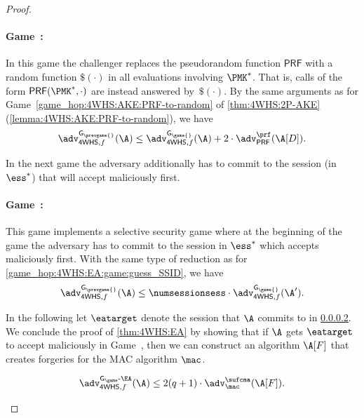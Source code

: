 \begin{proof}
\newgame
\paragraph{Game~\game:}\label{game_hop:4WHS:EA:PRF-to-random}
In this game the challenger replaces the pseudorandom function $\mathsf{PRF}$
with a random function $\$(\cdot)$ in all evaluations involving $\PMK^*$.
That is, calls of the form $\mathsf{PRF}(\PMK^*,\cdot)$ are instead answered by~$\$(\cdot)$.
By the same arguments as for Game~\ref{game_hop:4WHS:AKE:PRF-to-random} of \cref{thm:4WHS:2P-AKE} (\cref{lemma:4WHS:AKE:PRF-to-random}),
we have
\begin{equation}
	\adv_{\mathsf{4WHS},f}^{\mathsf{G_{\prevgame{}}}}(\A) 
		\leq  \adv_{\mathsf{4WHS},f}^{\mathsf{G_{\game{}}}}(\A) 
			+ 2\cdot \adv_{\mathsf{PRF}}^{\prf}(\A[D]) .
\end{equation}


In the next game the adversary additionally has to commit to the session (in $\ess^*$) that will accept maliciously first.


\newgame
\paragraph{Game~\game:}\label{game_hop:4WHS:EA:game:guess_session}
This game implements a selective security game where at the beginning of the game the adversary has to commit to the session in $\ess^*$ which accepts maliciously first.
With the same type of reduction as for \cref{game_hop:4WHS:EA:game:guess_SSID},
we have
\begin{equation}
	\adv_{\mathsf{4WHS},f}^{\mathsf{G_{\prevgame{}}}}(\A) 
		\leq  \numsessionsess \cdot \adv_{\mathsf{4WHS},f}^{\mathsf{G_{\game{}}}}(\A')  .
\end{equation}


In the following let $\eatarget$ denote the session that $\A$ commits to in \cref{game_hop:4WHS:EA:game:guess_session}.
We conclude the proof of \cref{thm:4WHS:EA} by showing that if $\A$ gets $\eatarget$ to accept maliciously in Game~\game{},
then we can construct an algorithm $\A[F]$ that creates forgeries for the MAC algorithm $\mac$.

\begin{claim}\label{lemma:4WHS:EA:forgery}
\begin{equation}
	\adv_{\mathsf{4WHS},f}^{\operatorname{\mathsf{G_{\game}-\EA}}}(\A)
	\leq 2  (q + 1) \cdot  \adv^{\sufcma}_{\mac}(\A[F]) .
\end{equation}
\end{claim}


\end{proof}
